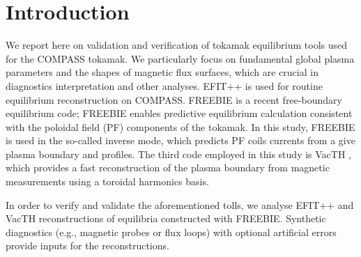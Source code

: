 
\section{Introduction} %
\label{sec:introduction}

We report here on validation and verification of tokamak equilibrium tools used for the COMPASS tokamak. We particularly focus on fundamental global plasma parameters and the shapes of magnetic flux surfaces, which are crucial in diagnostics interpretation and other analyses. 
EFIT++ \cite{efitpp2006} is used for routine equilibrium reconstruction on COMPASS. FREEBIE \cite{freebie2012} is a recent free-boundary equilibrium code; FREEBIE enables predictive equilibrium calculation consistent with the poloidal field (PF) components of the tokamak. In this study, FREEBIE is used in the so-called inverse mode, which predicts PF coils currents from a give plasma boundary and profiles. The third code employed in this study is VacTH \cite{vacthref}, which provides a fast reconstruction of the plasma boundary from magnetic measurements using a toroidal harmonics basis.

In order to verify and validate the aforementioned tolls, we analyse EFIT++ and VacTH reconstructions of equilibria constructed with FREEBIE. Synthetic diagnostics (e.g., magnetic probes or flux loops) with optional artificial errors provide inputs for the reconstructions. 

